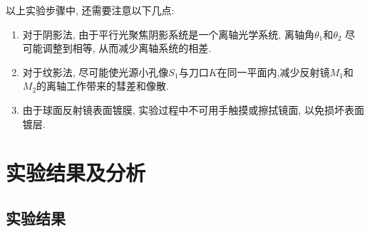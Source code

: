 \documentclass[12pt,a4paper,boxed,titlepage]{caspset}
\begin{document}
以上实验步骤中, 还需要注意以下几点:
\begin{enumerate}
\item 对于阴影法, 由于平行光聚焦阴影系统是一个离轴光学系统, 离轴角$\theta_1$和$\theta_2$ 尽可能调整到相等, 从而减少离轴系统的相差.
\item 对于纹影法, 尽可能使光源小孔像$S_1$与刀口$K$在同一平面内,减少反射镜$M_1$和$M_2$的离轴工作带来的彗差和像散.
\item 由于球面反射镜表面镀膜, 实验过程中不可用手触摸或擦拭镜面, 以免损坏表面镀层.
\end{enumerate}

\section{实验结果及分析}
\subsection{实验结果}
\end{document}
